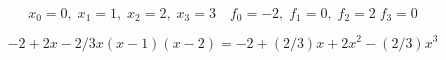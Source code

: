 \[ x_0=0, \; x_1=1, \; x_2=2, \; x_3=3 \quad f_0=-2, \; f_1=0, \; f_2=2 \; f_3=0 \]


\[ -2+2x-2/3 x(x-1)(x-2) = -2 +(2/3)x + 2x^2 - (2/3)x^3\]
